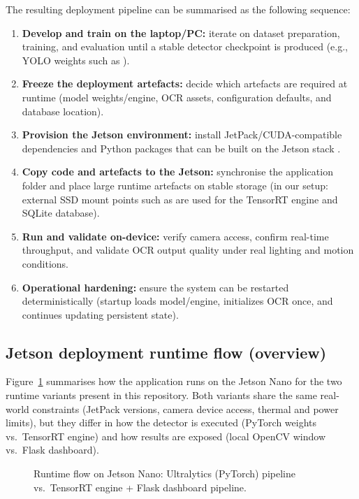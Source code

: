 \noindent
The resulting deployment pipeline can be summarised as the following sequence:
\begin{enumerate}
	\item \textbf{Develop and train on the laptop/PC:} iterate on dataset preparation, training, and evaluation until a stable detector checkpoint is produced (e.g., YOLO weights such as ).
	\item \textbf{Freeze the deployment artefacts:} decide which artefacts are required at runtime (model weights/engine, OCR assets, configuration defaults, and database location).
	\item \textbf{Provision the Jetson environment:} install JetPack/CUDA-compatible dependencies and Python packages that can be built on the Jetson stack \cite{nvidia-jetson}.
	\item \textbf{Copy code and artefacts to the Jetson:} synchronise the application folder and place large runtime artefacts on stable storage (in our setup: external SSD mount points such as  are used for the TensorRT engine and SQLite database).
	\item \textbf{Run and validate on-device:} verify camera access, confirm real-time throughput, and validate OCR output quality under real lighting and motion conditions.
	\item \textbf{Operational hardening:} ensure the system can be restarted deterministically (startup loads model/engine, initializes OCR once, and continues updating persistent state).
\end{enumerate}

\subsection{Jetson deployment runtime flow (overview)}
\label{sec:deployment_runtime_flow}

\noindent
Figure~\ref{fig:jetson_runtime_ultralytics_vs_tensorrt} summarises how the application runs on the Jetson Nano for the two runtime variants present in this repository.
Both variants share the same real-world constraints (JetPack versions, camera device access, thermal and power limits), but they differ in how the detector is executed (PyTorch weights vs.\ TensorRT engine) and how results are exposed (local OpenCV window vs.\ Flask dashboard).

\begin{figure}[htbp]
	\centering
	
	\caption{Runtime flow on Jetson Nano: Ultralytics (PyTorch) pipeline vs.\ TensorRT engine + Flask dashboard pipeline.}
	\label{fig:jetson_runtime_ultralytics_vs_tensorrt}
\end{figure}


